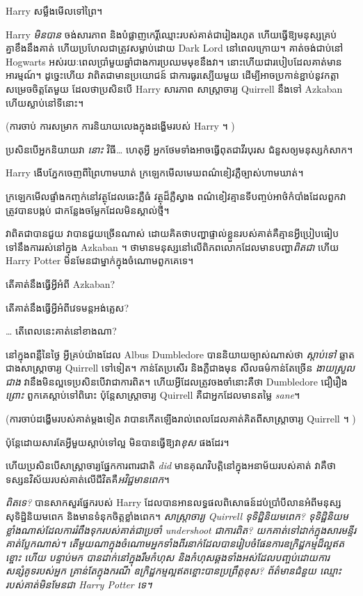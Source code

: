 {{{{{{{Harry សម្លឹងមើលទៅព្រៃ។

Harry \emph{មិនបាន} ចង់សារភាព និងបំផ្លាញកេរ្តិ៍ឈ្មោះរបស់គាត់ជារៀងរហូត ហើយធ្វើឱ្យមនុស្សគ្រប់គ្នាខឹងនឹងគាត់ ហើយប្រហែលជាត្រូវសម្លាប់ដោយ Dark Lord នៅពេលក្រោយ។ គាត់ចង់ជាប់នៅ Hogwarts អស់រយៈពេលប្រាំមួយឆ្នាំជាងការប្រឈមមុខនឹងវា។ នោះហើយជារបៀបដែលគាត់មានអារម្មណ៍។ ដូច្នេះហើយ វាពិតជាមានប្រយោជន៍ ជាការធូរស្បើយមួយ ដើម្បីអាចប្រកាន់ខ្ជាប់នូវកត្តាសម្រេចចិត្តតែមួយ ដែលថាប្រសិនបើ Harry សារភាព សាស្រ្តាចារ្យ Quirrell នឹងទៅ Azkaban ហើយស្លាប់នៅទីនោះ។

(ការចាប់ ការសម្រាក ការនិយាយលេងក្នុងដង្ហើមរបស់ Harry ។ )

ប្រសិនបើអ្នកនិយាយវា \emph{នោះ} វិធី… ហេតុអ្វី អ្នកថែមទាំងអាចធ្វើពុតជាវីរបុរស ជំនួសឲ្យមនុស្សកំសាក។

Harry ងើបភ្នែកចេញពីព្រៃហាមឃាត់ ក្រឡេកមើលមេឃពណ៌ខៀវភ្លឺច្បាស់ហាមឃាត់។

ក្រឡេកមើលផ្ទាំងកញ្ចក់នៅវត្ថុដែលឆេះភ្លឺធំ វត្ថុដ៏ភ្លឺស្វាង ពណ៌ខៀវគ្មានទីបញ្ចប់អាថ៌កំបាំងដែលពួកវាត្រូវបានបង្កប់ ជាកន្លែងចម្លែកដែលមិនស្គាល់ថ្មី។

វាពិតជាបានជួយ វាបានជួយច្រើនណាស់ ដោយគិតថាបញ្ហាផ្ទាល់ខ្លួនរបស់គាត់គឺគ្មានអ្វីប្រៀបធៀបទៅនឹងការរស់នៅក្នុង Azkaban ។ ថាមានមនុស្សនៅលើពិភពលោកដែលមានបញ្ហា\emph{ពិតជា} ហើយ Harry Potter មិនមែនជាម្នាក់ក្នុងចំណោមពួកគេទេ។

តើគាត់នឹងធ្វើអ្វីអំពី Azkaban?

តើគាត់នឹងធ្វើអ្វីអំពីវេទមន្តអង់គ្លេស?

… តើពេលនេះគាត់នៅខាងណា?

នៅក្នុងពន្លឺនៃថ្ងៃ អ្វីគ្រប់យ៉ាងដែល Albus Dumbledore បាននិយាយច្បាស់ណាស់ថា \emph{ស្តាប់ទៅ} ឆ្លាតជាងសាស្រ្តាចារ្យ Quirrell ទៅទៀត។ កាន់តែប្រសើរ និងភ្លឺជាងមុន សីលធម៌កាន់តែច្រើន \emph{ងាយស្រួលជាង} វានឹងមិនល្អទេប្រសិនបើវាជាការពិត។ ហើយអ្វីដែលត្រូវចងចាំនោះគឺថា Dumbledore ជឿរឿង \emph{ព្រោះ} ពួកគេស្តាប់ទៅពិរោះ ប៉ុន្តែសាស្រ្តាចារ្យ Quirrell គឺជាអ្នកដែលមានតម្លៃ \emph{sane}។

(ការចាប់ដង្ហើមរបស់គាត់ម្តងទៀត វាបានកើតឡើងរាល់ពេលដែលគាត់គិតពីសាស្រ្តាចារ្យ Quirrell ។ )

ប៉ុន្តែដោយសារតែអ្វីមួយស្តាប់ទៅល្អ មិនបានធ្វើឱ្យវា\emph{ខុស} ផងដែរ។

ហើយប្រសិនបើសាស្រ្តាចារ្យផ្នែកការពារជាតិ \emph{did} មានគុណវិបត្តិនៅក្នុងអនាម័យរបស់គាត់ វាគឺថាទស្សនវិស័យរបស់គាត់លើជីវិតគឺ\emph{អវិជ្ជមានពេក}។

\emph{ពិតទេ?} បានសាកសួរផ្នែករបស់ Harry ដែលបានអានលទ្ធផលពិសោធន៍ដប់ប្រាំបីលានអំពីមនុស្សសុទិដ្ឋិនិយមពេក និងមានទំនុកចិត្តខ្លាំងពេក។ \emph{សាស្រ្តាចារ្យ Quirrell ទុទិដ្ឋិនិយមពេក? ទុទិដ្ឋិនិយមខ្លាំងណាស់ដែលការរំពឹងទុករបស់គាត់ជាប្រចាំ \emph{undershoot} ជាការពិត? យក​គាត់​ទៅ​ដាក់​ក្នុង​សារមន្ទីរ គាត់​ប្លែក​ណាស់។ តើមួយណាក្នុងចំណោមអ្នកទាំងពីរនាក់ដែលបានរៀបចំផែនការឧក្រិដ្ឋកម្មដ៏ល្អឥតខ្ចោះ ហើយ \emph{បន្ទាប់មក} បានដាក់នៅក្នុងរឹមកំហុស និងកំហុសឆ្គងទាំងអស់ដែលបញ្ចប់ដោយការសន្សំគូទរបស់អ្នក \emph{គ្រាន់តែក្នុងករណី} ឧក្រិដ្ឋកម្មល្អឥតខ្ចោះបានប្រព្រឹត្តខុស? ព័ត៌មានជំនួយ ឈ្មោះរបស់គាត់មិនមែនជា Harry Potter ទេ។}

}}}}}}}
